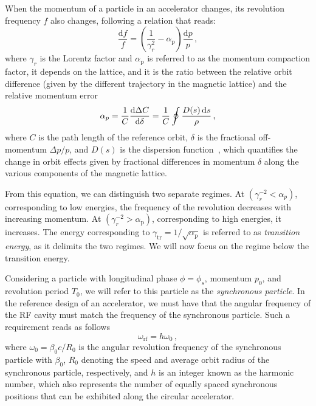 When the momentum of a particle in an accelerator changes, its revolution frequency $f$ also changes, following a relation that reads:
\begin{equation}
    \frac{\mathrm{d} f}{f}=\left(\frac{1}{\gamma_r^2}-\alpha_{\mathrm{p}}\right) \frac{\mathrm{d} p}{p}\,,
\end{equation}
where $\gamma_r$ is the Lorentz factor and $\alpha_{\mathrm{p}}$ is referred to as the momentum compaction factor, it depends on the lattice, and it is the ratio between the relative orbit difference (given by the different trajectory in the magnetic lattice) and the relative momentum error
\begin{equation}
    \alpha_p = \frac{1}{C}\dv{\Delta C}{\delta} = \frac{1}{C} \oint \frac{{D}(s)\,\mathrm{d}s}{\rho}\,,
\end{equation}
where $C$ is the path length of the reference orbit, $\delta$ is the fractional off-momentum $\Delta p / p$, and ${D}(s)$ is the dispersion function~\cite{Lee:2651939}, which quantifies the change in orbit effects given by fractional differences in momentum $\delta$ along the various components of the magnetic lattice.

From this equation, we can distinguish two separate regimes. At $\left(\gamma_r^{-2}<\alpha_p\right)$, corresponding to low energies, the frequency of the revolution decreases with increasing momentum. At $\left(\gamma_r^{-2}>\alpha_{\mathrm{p}}\right)$, corresponding to high energies, it increases. The energy corresponding to $\gamma_{\mathrm{tr}}=1 / \sqrt{\alpha_{\mathrm{p}}}$ is referred to as \textit{transition energy}, as it delimits the two regimes. We will now focus on the regime below the transition energy.

Considering a particle with longitudinal phase $\phi=\phi_s$, momentum $p_0$, and revolution period $T_0$, we will refer to this particle as the \textit{synchronous particle}. In the reference design of an accelerator, we must have that the angular frequency of the RF cavity must match the frequency of the synchronous particle. Such a requirement reads as follows
\begin{equation}
    \omega_{\mathrm{rf}}=h \omega_0\,,
\end{equation}
where $\omega_0=\beta_0 c / R_0$ is the angular revolution frequency of the synchronous particle with $\beta_0$, $R_0$ denoting the speed and average orbit radius of the synchronous particle, respectively, and $h$ is an integer known as the harmonic number, which also represents the number of equally spaced synchronous positions that can be exhibited along the circular accelerator.

